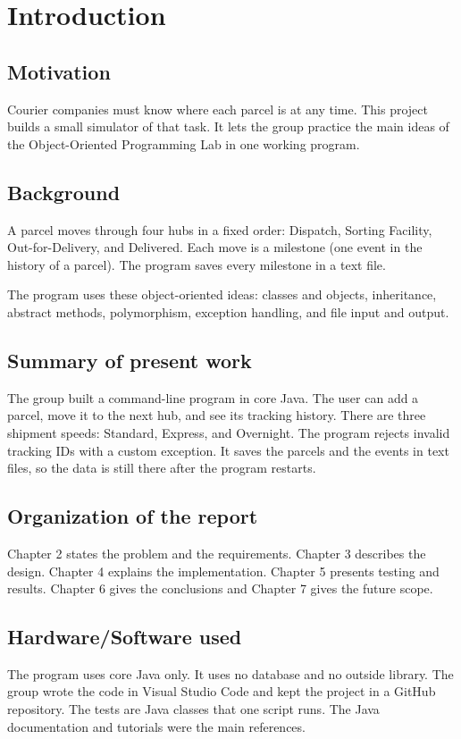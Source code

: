 \chapter{Introduction}

\section{Motivation}
Courier companies must know where each parcel is at any time. This project
builds a small simulator of that task. It lets the group practice the main
ideas of the Object-Oriented Programming Lab in one working program.

\section{Background}
A parcel moves through four hubs in a fixed order: Dispatch, Sorting Facility,
Out-for-Delivery, and Delivered. Each move is a milestone (one event in the
history of a parcel). The program saves every milestone in a text file.

The program uses these object-oriented ideas: classes and objects,
inheritance, abstract methods, polymorphism, exception handling, and file
input and output.

\section{Summary of present work}
The group built a command-line program in core Java. The user can add a
parcel, move it to the next hub, and see its tracking history. There are three
shipment speeds: Standard, Express, and Overnight. The program rejects invalid
tracking IDs with a custom exception. It saves the parcels and the events in
text files, so the data is still there after the program restarts.

\section{Organization of the report}
Chapter 2 states the problem and the requirements. Chapter 3 describes the
design. Chapter 4 explains the implementation. Chapter 5 presents testing and
results. Chapter 6 gives the conclusions and Chapter 7 gives the future scope.

\section{Hardware/Software used}
The program uses core Java only. It uses no database and no outside library.
The group wrote the code in Visual Studio Code and kept the project in a
GitHub repository. The tests are Java classes that one script runs. The Java documentation
and tutorials \cite{ref1,ref2,ref3} were the main references.
